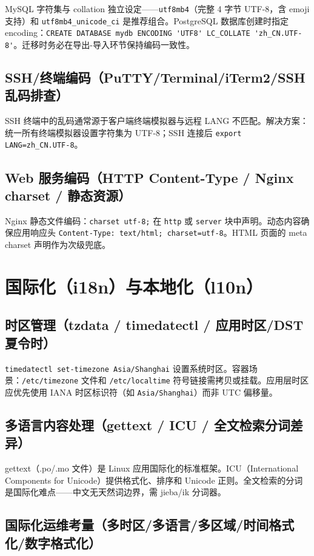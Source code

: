 \documentclass[12pt,UTF8]{ctexbook}
\begin{document}
MySQL 字符集与 collation 独立设定——\verb|utf8mb4|（完整 4 字节 UTF-8，含 emoji 支持）和 \verb|utf8mb4_unicode_ci| 是推荐组合。PostgreSQL 数据库创建时指定 encoding：\verb|CREATE DATABASE mydb ENCODING 'UTF8' LC_COLLATE 'zh_CN.UTF-8'|。迁移时务必在导出-导入环节保持编码一致性。

    \subsection{SSH/终端编码（PuTTY/Terminal/iTerm2/SSH 乱码排查）}

SSH 终端中的乱码通常源于客户端终端模拟器与远程 LANG 不匹配。解决方案：统一所有终端模拟器设置字符集为 UTF-8；SSH 连接后 \verb|export LANG=zh_CN.UTF-8|。

    \subsection{Web 服务编码（HTTP Content-Type / Nginx charset / 静态资源）}

Nginx 静态文件编码：\verb|charset utf-8;| 在 \verb|http| 或 \verb|server| 块中声明。动态内容确保应用响应头 \verb|Content-Type: text/html; charset=utf-8|。HTML 页面的 meta charset 声明作为次级兜底。

  \section{国际化（i18n）与本地化（l10n）}
    \subsection{时区管理（tzdata / timedatectl / 应用时区/DST 夏令时）}

\verb|timedatectl set-timezone Asia/Shanghai| 设置系统时区。容器场景：\verb|/etc/timezone| 文件和 \verb|/etc/localtime| 符号链接需拷贝或挂载。应用层时区应优先使用 IANA 时区标识符（如 \verb|Asia/Shanghai|）而非 UTC 偏移量。

    \subsection{多语言内容处理（gettext / ICU / 全文检索分词差异）}

gettext（.po/.mo 文件）是 Linux 应用国际化的标准框架。ICU（International Components for Unicode）提供格式化、排序和 Unicode 正则。全文检索的分词是国际化难点——中文无天然词边界，需 jieba/ik 分词器。

    \subsection{国际化运维考量（多时区/多语言/多区域/时间格式化/数字格式化）}
\end{document}

